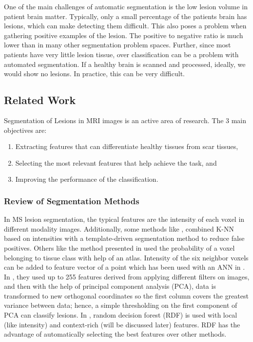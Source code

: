 \documentclass{article} %
\begin{document}
One of the main challenges of automatic segmentation is the low lesion volume in patient brain matter. Typically, only a small percentage of the patients brain has lesions, which can make detecting them difficult. This also poses a problem when gathering positive examples of the lesion. The positive to negative ratio is much lower than in many other segmentation problem spaces. Further, since most patients have very little lesion tissue, over classification can be a problem with automated segmentation. If a healthy brain is scanned and processed, ideally, we would show no lesions. In practice, this can be very difficult.


\subsection{Related Work}
Segmentation of Lesions in MRI images is an active area of research. The 3 main objectives are: 
\begin{enumerate}
  \item Extracting features that can differentiate healthy tissues from scar tissues, 
  \item Selecting the most relevant features that help achieve the task, and
  \item Improving the performance of the classification.
\end{enumerate} 

\subsubsection{Review of Segmentation Methods}
In MS lesion segmentation, the typical features are the intensity of each voxel in different modality images. Additionally, some methods like  \cite{commowick2009continuous}, combined K-NN based on intensities with a template-driven segmentation method to reduce false positives. Others like the method presented in \cite{zijdenbos2002automatic} used the probability of a voxel belonging to tissue class with help of an atlas. Intensity of the six neighbor voxels can be added to feature vector of a point which has been used with an ANN in \cite{younis2007ms}. In \cite{kroon2008multiple}, they used up to 255 features derived from applying different filters on images, and then with the help of principal component analysis (PCA), data is transformed to new orthogonal coordinates so the first column covers the greatest variance between data; hence, a simple thresholding on the first component of PCA can classify lesions. In \cite{geremia2011spatial}, random decision forest (RDF) is used with local (like intensity) and context-rich (will be discussed later) features. RDF has the advantage of automatically selecting the best features over other methods.
\end{document}
